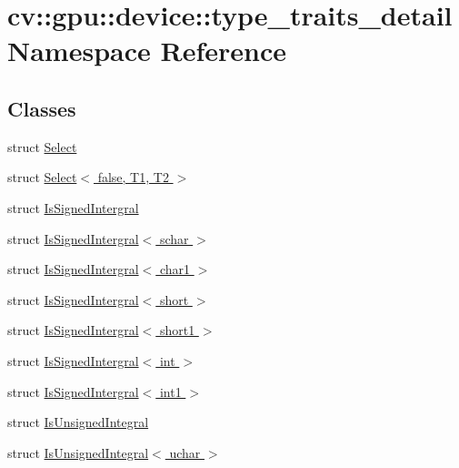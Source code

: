 \hypertarget{namespacecv_1_1gpu_1_1device_1_1type__traits__detail}{\section{cv\-:\-:gpu\-:\-:device\-:\-:type\-\_\-traits\-\_\-detail Namespace Reference}
\label{namespacecv_1_1gpu_1_1device_1_1type__traits__detail}
}
\subsection*{Classes}
\begin{DoxyCompactItemize}
\item 
struct \hyperlink{structcv_1_1gpu_1_1device_1_1type__traits__detail_1_1Select}{Select}
\item 
struct \hyperlink{structcv_1_1gpu_1_1device_1_1type__traits__detail_1_1Select_3_01false_00_01T1_00_01T2_01_4}{Select$<$ false, T1, T2 $>$}
\item 
struct \hyperlink{structcv_1_1gpu_1_1device_1_1type__traits__detail_1_1IsSignedIntergral}{Is\-Signed\-Intergral}
\item 
struct \hyperlink{structcv_1_1gpu_1_1device_1_1type__traits__detail_1_1IsSignedIntergral_3_01schar_01_4}{Is\-Signed\-Intergral$<$ schar $>$}
\item 
struct \hyperlink{structcv_1_1gpu_1_1device_1_1type__traits__detail_1_1IsSignedIntergral_3_01char1_01_4}{Is\-Signed\-Intergral$<$ char1 $>$}
\item 
struct \hyperlink{structcv_1_1gpu_1_1device_1_1type__traits__detail_1_1IsSignedIntergral_3_01short_01_4}{Is\-Signed\-Intergral$<$ short $>$}
\item 
struct \hyperlink{structcv_1_1gpu_1_1device_1_1type__traits__detail_1_1IsSignedIntergral_3_01short1_01_4}{Is\-Signed\-Intergral$<$ short1 $>$}
\item 
struct \hyperlink{structcv_1_1gpu_1_1device_1_1type__traits__detail_1_1IsSignedIntergral_3_01int_01_4}{Is\-Signed\-Intergral$<$ int $>$}
\item 
struct \hyperlink{structcv_1_1gpu_1_1device_1_1type__traits__detail_1_1IsSignedIntergral_3_01int1_01_4}{Is\-Signed\-Intergral$<$ int1 $>$}
\item 
struct \hyperlink{structcv_1_1gpu_1_1device_1_1type__traits__detail_1_1IsUnsignedIntegral}{Is\-Unsigned\-Integral}
\item 
struct \hyperlink{structcv_1_1gpu_1_1device_1_1type__traits__detail_1_1IsUnsignedIntegral_3_01uchar_01_4}{Is\-Unsigned\-Integral$<$ uchar $>$}

\end{DoxyCompactItemize}
